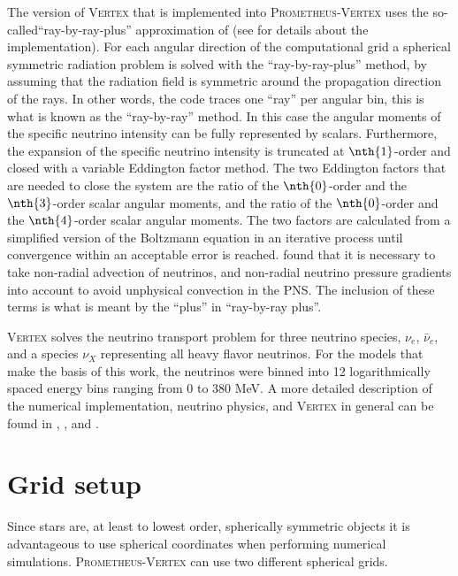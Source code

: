 The version of \textsc{Vertex} that is implemented into \textsc{Prometheus-Vertex} uses
the so-called``ray-by-ray-plus'' approximation of \cite{buras_06a} (see \cite{hanke_phd} for details about the implementation).
For each angular direction of the computational grid a spherical symmetric radiation problem is solved
with the ``ray-by-ray-plus'' method, by assuming that the radiation field is symmetric around the propagation direction of the rays.
In other words, the code traces one ``ray'' per angular bin, this is what is known as the ``ray-by-ray'' method.
In this case the angular moments of the specific neutrino intensity can be fully represented by scalars.
Furthermore, the expansion of the specific neutrino intensity is truncated at $\nth{1}$-order and
closed with a variable Eddington factor method. The two Eddington factors that are needed to close the system are the ratio of
the $\nth{0}$-order and the $\nth{3}$-order scalar angular moments, and the ratio of the $\nth{0}$-order and the $\nth{4}$-order scalar angular moments. 
The two factors are calculated from a simplified version of the Boltzmann equation in an iterative process until convergence within an acceptable error is reached. 
\cite{buras_06b} found that it is necessary to take non-radial advection of neutrinos, and non-radial neutrino pressure gradients into account to avoid unphysical convection in the PNS. 
The inclusion of these terms is what is meant by the ``plus'' in ``ray-by-ray plus''.

\textsc{Vertex} solves the neutrino transport problem for three neutrino species, $\nu_e$, $\bar{\nu}_e$, and a species $\nu_X$ representing
all heavy flavor neutrinos. 
For the models that make the basis of this work, the neutrinos were binned into 12 logarithmically spaced energy bins ranging from 0 to 380 MeV.  
A more detailed description of the numerical implementation, neutrino physics, and \textsc{Vertex} in general can
be found in \cite{rampp_02}, \cite{hanke_phd}, and \cite{melson_phd}.

\section{Grid setup}
Since stars are, at least to lowest order, spherically symmetric objects it is advantageous to use spherical coordinates when performing numerical simulations.
\textsc{Prometheus-Vertex} can use two different spherical grids.

